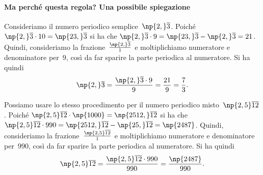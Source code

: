 

\paragraph*{Ma perché questa regola? Una possibile spiegazione}
Consideriamo il numero periodico semplice~$\np{2,}\overline{3}$.
Poiché $\np{2,}\overline{3} \cdot 10 = \np{23,}\overline{3}$ si ha che $\np{2,}\overline{3} \cdot 9 = \np{23,}\overline{3} - \np{2,}\overline{3} = 21$.
Quindi, consideriamo la frazione~$\frac{\np{2,}\overline{3}}{1}$ e moltiplichiamo numeratore e denominatore per~$9$, così da far sparire
la parte periodica al numeratore. Si ha quindi
\[\np{2,}\overline{3}=\frac{\np{2,}\overline{3}\cdot 9}{9}=\frac{21}{9}=\frac{7}{3}.\]

%
%

Possiamo usare lo stesso procedimento per il numero periodico misto~$\np{2,5}\overline{12}$.
Poiché $\np{2,5}\overline{12} \cdot \np{1000} = \np{2512,}\overline{12}$ si ha che $\np{2,5}\overline{12} \cdot 990 = \np{2512,}\overline{12} - \np{25,}\overline{12} = \np{2487}$.
Quindi, consideriamo la frazione~$\frac{\np{2,5}\overline{12}}{1}$ e moltiplichiamo numeratore e denominatore per~$990$, così da far sparire
la parte periodica al numeratore. Si ha quindi
\[\np{2,5}\overline{12}=\frac{\np{2,5}\overline{12} \cdot 990}{990}=\frac{\np{2487}}{990}.\]

